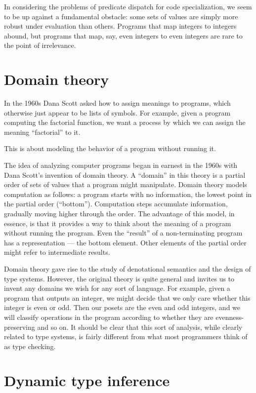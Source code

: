 In considering the problems of predicate dispatch for code specialization,
we seem to be up against a fundamental obstacle: some sets of values are
simply more robust under evaluation than others. Programs that map integers
to integers abound, but programs that map, say, even integers to even
integers are rare to the point of irrelevance.


\section{Domain theory}

In the 1960s Dana Scott asked how to assign meanings to programs,
which otherwise just appear to be lists of symbols.
For example, given a program computing the factorial function, we
want a process by which we can assign the meaning ``factorial'' to it.

This is about modeling the behavior of a program without running it.



The idea of analyzing computer programs began in earnest in the 1960s with
Dana Scott's invention of domain theory. A ``domain'' in this theory is a
partial order of sets of values that a program might manipulate. 
Domain theory models computation as follows: a program starts with no
information, the lowest point in the partial order (``bottom'').
Computation steps accumulate information, gradually moving higher through
the order. The advantage of this model, in essence, is that it provides a
way to think about the meaning of a program without running the program.
Even the ``result'' of a non-terminating program has a representation ---
the bottom element. Other elements of the partial order might refer to
intermediate results.


Domain theory gave rise to the study of denotational semantics and the
design of type systems. However, the original theory is quite general
and invites us to invent any domains we wish for any sort of language.
For example, given a program that outputs an integer, we might decide
that we only care whether this integer is even or odd. Then our posets
are the even and odd integers, and we will classify operations in the
program according to whether they are evenness-preserving and so on.
It should be clear that this sort of analysis, while clearly related
to type systems, is fairly different from what most programmers
think of as type checking.




\section{Dynamic type inference}


